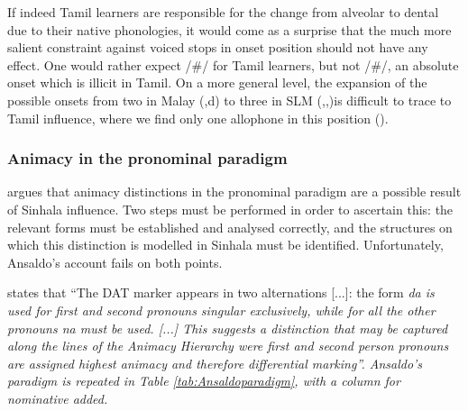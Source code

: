 \documentclass[a4paper,10pt]{article}
\newcommand{\D}{\dz}
\begin{document}
If indeed Tamil learners are responsible for the change from alveolar to dental due to their native phonologies, it would come as a surprise that the much more salient constraint against voiced stops in onset position should not have any effect. One would rather expect /\#\dentt/ for Tamil learners, but not /\#\dentd/, an absolute onset which is illicit in Tamil. On a more general level, the expansion of the possible onsets from two in Malay (\dentt,d) to three in SLM (\dentt,\dentd,\D{})is difficult to trace to Tamil influence, where we find only one allophone in this position (\dentt).


\subsubsection{Animacy in the pronominal paradigm}
\citet{Ansaldo2008genesis} argues that animacy distinctions in the pronominal paradigm are a possible result of Sinhala influence. Two steps must be performed in order to ascertain this: the relevant forms must be established and analysed correctly, and the structures on which this distinction is modelled in Sinhala must be identified. Unfortunately, Ansaldo's account fails on both points.

\citet[30]{Ansaldo2008genesis} states that ``The DAT marker appears in two alternations [...]:  the form \em da\ng{} \em is used for first and second pronouns singular exclusively, while for all the other pronouns \em na\ng{} \em must be used. [...] This suggests a distinction that may be captured along the lines of the Animacy Hierarchy were first and second person pronouns are assigned highest animacy and therefore differential marking''. Ansaldo's paradigm is repeated in Table \ref{tab:Ansaldoparadigm}, with a column for nominative added.

\end{document}
